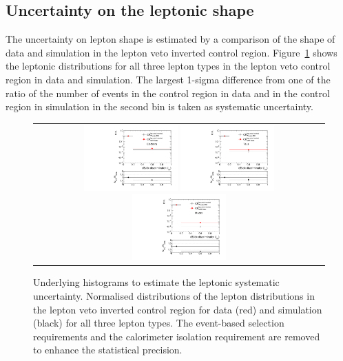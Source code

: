 \subsection{Uncertainty on the leptonic \ias shape}
\label{sec:LeptonIasUncertainty}

The uncertainty on lepton \ias shape is estimated by a comparison of the \ias shape of data and simulation in the lepton veto inverted control region.
Figure~\ref{fig:LeptonIasUnc} shows the leptonic \ias distributions for all three lepton types in the lepton veto control region in data and simulation.
The largest 1-sigma difference from one of the ratio of the number of events in the control region in data and in the control region in simulation in the second bin is taken as systematic uncertainty.
\begin{figure}[!h]
  \centering 
  \begin{tabular}{c}
    \includegraphics[width=0.33\textwidth]{figures/analysis/Background/hASmi_SRbinning_Electrons_MCCR_DataCR.pdf}
    \includegraphics[width=0.33\textwidth]{figures/analysis/Background/hASmi_SRbinning_Taus_MCCR_DataCR.pdf}
    \includegraphics[width=0.33\textwidth]{figures/analysis/Background/hASmi_SRbinning_Muons_MCCR_DataCR.pdf}
  \end{tabular}
  \caption{Underlying histograms to estimate the leptonic \ias systematic uncertainty. Normalised distributions of the lepton \ias distributions in the lepton veto inverted control region for data (red) and simulation (black) for all three lepton types. The event-based selection requirements and the calorimeter isolation requirement are removed to enhance the statistical precision.}
  \label{fig:LeptonIasUnc}
\end{figure}

